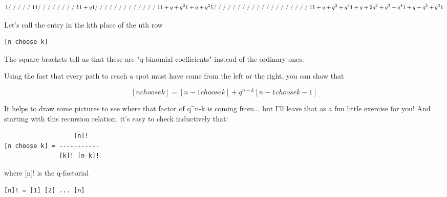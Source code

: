 $$
                               1
                              / \
                             /   \
                            /     \
                           /       \
                          /         \
                         1           1
                        / \         / \
                       /   \       /   \
                      /     \     /     \
                     /       \   /       \                
                    1         1+q         1
                   / \        / \        / \
                  /   \      /   \      /   \
                 /     \    /     \    /     \
                /       \  /       \  /       \
               /         \/         \/         \
              1        1+q+q^{2}      1+q+q^{2 }       1
             / \         /\         /\         / \
            /   \       /  \       /  \       /   \
           /     \     /    \     /    \     /     \
          /       \   /      \   /      \   /       \
         /         \ /        \ /        \ /         \
        1    1+q+q^{2}+q^{3}    1+q+2q^{2}+q^{3}+q^{4}  1+q+q^{2}+q^{3 }     1

$$
    
Let's call the entry in the kth place of the nth row 

\begin{verbatim}
[n choose k]
\end{verbatim}
    
The square brackets tell us that these are "q-binomial coefficients"
instead of the ordinary ones.

Using the fact that every path to reach a spot must have come 
from the left or the right, you can show that

$$
[n choose k]  =  [n-1 choose k]  +  q^{n-k} [n-1 choose k-1]
$$
    
It helps to draw some pictures to see where that factor of q^{n-k} is
coming from... but I'll leave that as a fun little exercise for you!   
And starting with this recursion relation, it's easy to check inductively 
that:

\begin{verbatim}
                   [n]!
[n choose k] = -----------
               [k]! [n-k]!
\end{verbatim}
    
where [n]! is the q-factorial

\begin{verbatim}
[n]! = [1] [2] ... [n]
\end{verbatim}
    
